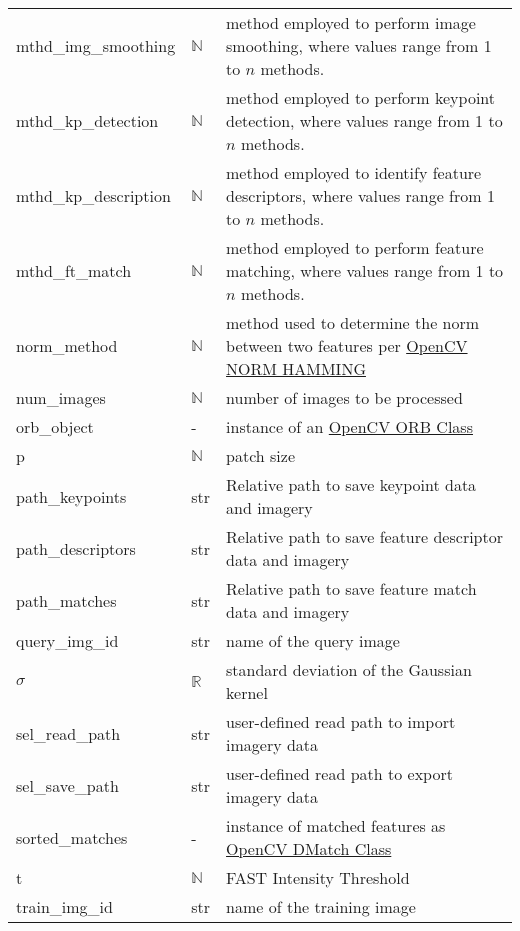 \documentclass[12pt, titlepage]{article}
\begin{document}
\begin{longtable*}{|l l p{12cm}|}
mthd\_img\_smoothing & $\mathbb{N}$ & method employed to perform image smoothing, where values range from 1 to $n$ methods.\\
mthd\_kp\_detection & $\mathbb{N}$ & method employed to perform keypoint detection, where values range from 1 to $n$ methods.\\
mthd\_kp\_description & $\mathbb{N}$ & method employed to identify feature descriptors, where values range from 1 to $n$ methods.\\
mthd\_ft\_match & $\mathbb{N}$ & method employed to perform feature matching, where values range from 1 to $n$ methods.\\
norm\_method & $\mathbb{N}$ & method used to determine the norm between two features per \href{https://docs.opencv.org/4.x/d2/de8/group__core__array.html#ggad12cefbcb5291cf958a85b4b67b6149fa4b063afd04aebb8dd07085a1207da727}{OpenCV NORM HAMMING}\\ 
num\_images & $\mathbb{N}$ & number of images to be processed\\
orb\_object & - &	instance of an \href{https://docs.opencv.org/3.4/db/d95/classcv_1_1ORB.html}{OpenCV ORB Class}\\
p	& $\mathbb{N}$ & patch size\\
path\_keypoints	& str	& Relative path to save keypoint data and imagery\\
path\_descriptors & str	& Relative path to save feature descriptor data and imagery\\
path\_matches	& str	& Relative path to save feature match data and imagery\\
query\_img\_id & str & name of the query image\\
$\sigma$ & $\mathbb{R}$ & standard deviation of the Gaussian kernel\\
sel\_read\_path & str & user-defined read path to import imagery data\\
sel\_save\_path & str & user-defined read path to export imagery data\\
sorted\_matches & - & instance of matched features as \href{https://docs.opencv.org/3.4/d4/de0/classcv_1_1DMatch.html}{OpenCV DMatch Class} \\
t & $\mathbb{N}$ & FAST Intensity Threshold \\
train\_img\_id & str & name of the training image\\


\bottomrule
\end{longtable*}
\end{document}
